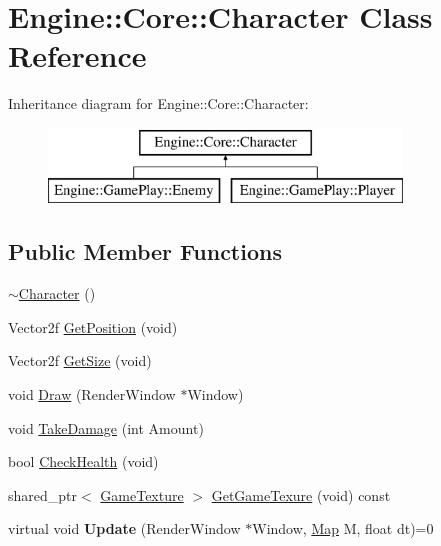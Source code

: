 \hypertarget{class_engine_1_1_core_1_1_character}{}\section{Engine\+:\+:Core\+:\+:Character Class Reference}
\label{class_engine_1_1_core_1_1_character}
Inheritance diagram for Engine\+:\+:Core\+:\+:Character\+:\begin{figure}[H]
\begin{center}
\leavevmode
\includegraphics[height=2.000000cm]{class_engine_1_1_core_1_1_character}
\end{center}
\end{figure}
\subsection*{Public Member Functions}
\begin{DoxyCompactItemize}
\item 
\hyperlink{class_engine_1_1_core_1_1_character_a0377de26714b79374d0591ca44c77fd1}{$\sim$\+Character} ()
\item 
Vector2f \hyperlink{class_engine_1_1_core_1_1_character_aea290308ddc56ab784c87f85e6b7f254}{Get\+Position} (void)
\item 
Vector2f \hyperlink{class_engine_1_1_core_1_1_character_a3465481aed27d24909b8e40577f09b10}{Get\+Size} (void)
\item 
void \hyperlink{class_engine_1_1_core_1_1_character_ae25a76e7497eeb6dbd1ad3b72c1ff721}{Draw} (Render\+Window $\ast$Window)
\item 
void \hyperlink{class_engine_1_1_core_1_1_character_a2156c371584ca6a8d2961154f1b49c09}{Take\+Damage} (int Amount)
\item 
bool \hyperlink{class_engine_1_1_core_1_1_character_ad32924505f5bc7761590ecbfd06e6f09}{Check\+Health} (void)
\item 
shared\+\_\+ptr$<$ \hyperlink{class_engine_1_1_core_1_1_game_texture}{Game\+Texture} $>$ \hyperlink{class_engine_1_1_core_1_1_character_afff37c4ff688837f42509f721853bab8}{Get\+Game\+Texure} (void) const
\item 
\mbox{\label{class_engine_1_1_core_1_1_character_a45c8ef2c736469a3264ee8733305675c}} 
virtual void {\bfseries Update} (Render\+Window $\ast$Window, \hyperlink{class_engine_1_1_core_1_1_map}{Map} M, float dt)=0
\end{DoxyCompactItemize}
